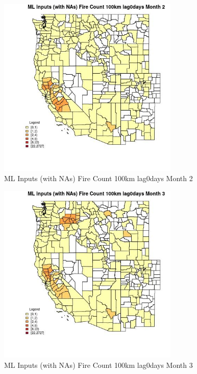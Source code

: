 \begin{figure} 
\centering  
\includegraphics[width=0.77\textwidth]{Code_Outputs/Report_ML_input_PM25_Step4_part_f_de_duplicated_aveswNAs_CountyFire_Count_100km_lag0daysmedianMonth2.jpg} 
\caption{\label{fig:Report_ML_input_PM25_Step4_part_f_de_duplicated_aveswNAsCountyFire_Count_100km_lag0daysmedianMonth2}ML Inputs (with NAs) Fire Count 100km lag0days Month 2} 
\end{figure} 
 

\begin{figure} 
\centering  
\includegraphics[width=0.77\textwidth]{Code_Outputs/Report_ML_input_PM25_Step4_part_f_de_duplicated_aveswNAs_CountyFire_Count_100km_lag0daysmedianMonth3.jpg} 
\caption{\label{fig:Report_ML_input_PM25_Step4_part_f_de_duplicated_aveswNAsCountyFire_Count_100km_lag0daysmedianMonth3}ML Inputs (with NAs) Fire Count 100km lag0days Month 3} 
\end{figure} 
 

